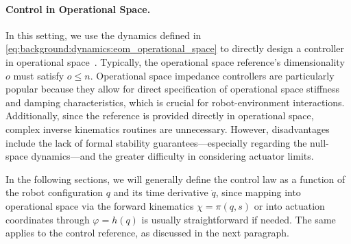\paragraph{Control in Operational Space.}
In this setting, we use the dynamics defined in \eqref{eq:background:dynamics:eom_operational_space} to directly design a controller in operational space~\citep{khatib1987unified}. Typically, the operational space reference’s dimensionality $o$ must satisfy $o \leq n$. Operational space impedance controllers are particularly popular because they allow for direct specification of operational space stiffness and damping characteristics, which is crucial for robot-environment interactions. Additionally, since the reference is provided directly in operational space, complex inverse kinematics routines are unnecessary. However, disadvantages include the lack of formal stability guarantees—especially regarding the null-space dynamics—and the greater difficulty in considering actuator limits.

In the following sections, we will generally define the control law as a function of the robot configuration $q$ and its time derivative $\dot{q}$, since mapping into operational space via the forward kinematics $\chi = \pi(q,s)$ or into actuation coordinates through $\varphi = h(q)$ is usually straightforward if needed. The same applies to the control reference, as discussed in the next paragraph.

